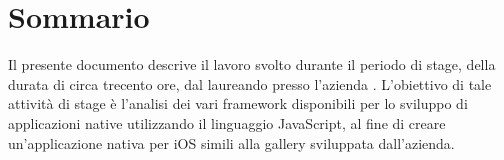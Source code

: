 
\cleardoublepage
{}
{}
\begingroup
\let\clearpage\relax
\let\cleardoublepage\relax
\let\cleardoublepage\relax

\chapter*{Sommario}

Il presente documento descrive il lavoro svolto durante il periodo di stage, della durata di circa trecento ore, dal laureando \myName presso l'azienda \myCompany.
L'obiettivo di tale attività di stage è l'analisi dei vari framework disponibili per lo sviluppo di applicazioni native utilizzando il linguaggio JavaScript, al fine di creare un'applicazione nativa per iOS simili alla gallery sviluppata dall'azienda.
%
%

\endgroup			

\vfill

